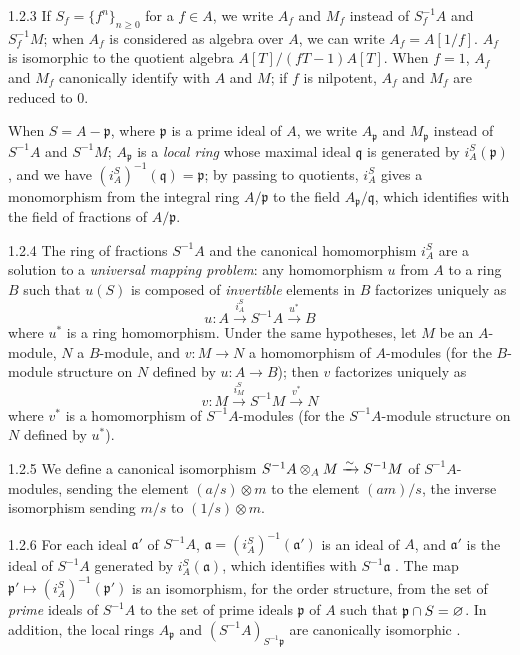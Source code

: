 \begin{env}{1.2.3}
\label{env-0.1.2.3}
If $S_f=\{f^n\}_{n\geqslant 0}$ for a $f\in A$, we write $A_f$ and $M_f$ instead
of $S_f^{-1}A$ and $S_f^{-1}M$; when $A_f$ is considered as algebra over $A$, we
can write $A_f=A[1/f]$. $A_f$ is isomorphic to the quotient algebra
$A[T]/(fT-1)A[T]$. When $f=1$, $A_f$ and $M_f$ canonically identify with $A$ and
$M$; if $f$ is nilpotent, $A_f$ and $M_f$ are reduced to $0$.

When $S=A-\mathfrak{p}$, where $\mathfrak{p}$ is a prime ideal of $A$, we write
$A_\mathfrak{p}$ and $M_\mathfrak{p}$ instead of $S^{-1}A$ and $S^{-1}M$;
$A_\mathfrak{p}$ is a \emph{local ring} whose maximal ideal $\mathfrak{q}$ is
generated by $i_A^S(\mathfrak{p})$, and we have
$(i_A^S)^{-1}(\mathfrak{q})=\mathfrak{p}$; by passing to quotients, $i_A^S$
gives a monomorphism from the integral ring $A/\mathfrak{p}$ to the field
$A_\mathfrak{p}/\mathfrak{q}$, which identifies with the field of fractions of
$A/\mathfrak{p}$.
\end{env}

\begin{env}{1.2.4}
\label{env-0.1.2.4}
The ring of fractions $S^{-1}A$ and the canonical homomorphism $i_A^S$ are a
solution to a \emph{universal mapping problem}: any homomorphism $u$ from $A$ to
a ring $B$ such that $u(S)$ is composed of \emph{invertible} elements in $B$
factorizes uniquely as
\[
  u:A\xrightarrow{i_A^S}S^{-1}A\xrightarrow{u^*}B
\]
where $u^*$ is a ring homomorphism. Under the same hypotheses, let $M$ be an
$A$-module, $N$ a $B$-module, and $v:M\to N$ a homomorphism of $A$-modules (for
the $B$-module structure on $N$ defined by $u:A\to B$); then $v$ factorizes
uniquely as
\[
  v:M\xrightarrow{i_M^S}S^{-1}M\xrightarrow{v^*}N
\]
where $v^*$ is a homomorphism of $S^{-1}A$-modules (for the $S^{-1}A$-module
structure on $N$ defined by $u^*$).
\end{env}

\begin{env}{1.2.5}
\label{env-0.1.2.5}
We define a canonical isomorphism $S^{-1}A\otimes_A M\xrightarrow{\sim} S^{-1}M$ of
$S^{-1}A$-modules, sending the element $(a/s)\otimes m$ to the element $(am)/s$,
the inverse isomorphism sending $m/s$ to $(1/s)\otimes m$.
\end{env}

\begin{env}{1.2.6}
\label{env-0.1.2.6}
For each ideal $\mathfrak{a}'$ of $S^{-1}A$,
$\mathfrak{a}=(i_A^S)^{-1}(\mathfrak{a}')$ is an ideal of $A$, and
$\mathfrak{a}'$ is the ideal of $S^{-1}A$ generated by $i_A^S(\mathfrak{a})$,
which identifies with $S^{-1}\mathfrak{a}$ . The map
$\mathfrak{p}'\mapsto(i_A^S)^{-1}(\mathfrak{p}')$ is an isomorphism, for the
order structure, from the set of \emph{prime} ideals of $S^{-1}A$ to the set of
prime ideals $\mathfrak{p}$ of $A$ such that $\mathfrak{p}\cap S=\varnothing$. In
addition, the local rings $A_\mathfrak{p}$ and $(S^{-1}A)_{S^{-1}\mathfrak{p}}$
are canonically isomorphic .
\end{env}

